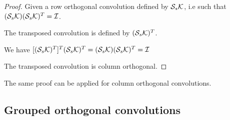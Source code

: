 \begin{proof}
Given a row orthogonal convolution defined by $\mathcal{S}_{s} \mathcal{K}$, i.e such that $ (\mathcal{S}_{s} \mathcal{K})(\mathcal{S}_{s} \mathcal{K})^T = \mathcal{I}$.

The transposed convolution is defined by $(\mathcal{S}_{s} \mathcal{K})^T$.

We have $[(\mathcal{S}_{s} \mathcal{K})^T]^T(\mathcal{S}_{s} \mathcal{K})^T=(\mathcal{S}_{s} \mathcal{K})(\mathcal{S}_{s} \mathcal{K})^T = \mathcal{I}$

The transposed convolution is column orthogonal.
\end{proof}

The same proof can be applied for  column orthogonal convolutions. 


\subsection{Grouped orthogonal convolutions}
\label{sec:ap_proof_grouped}

